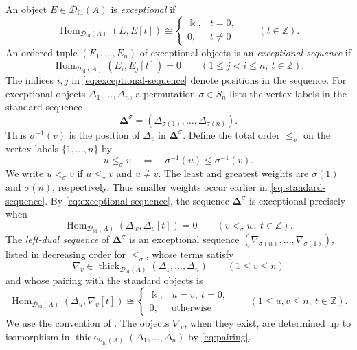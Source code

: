 \documentclass[11pt,a4paper]{article}
\newcommand{\defn}[1]{\textsl{\color{darkblue} #1}}
\newcommand{\D}{\mathcal D}
\newcommand{\ZZ}{\mathbb{Z}}
\newcommand{\std}{\Delta}
\newcommand{\costd}{\nabla}
\DeclareMathOperator{\fd}{fd}
\DeclareMathOperator{\Hom}{Hom}
\DeclareMathOperator{\thick}{thick}
\theoremstyle{plain}
\theoremstyle{definition}
\numberwithin{equation}{section}
\begin{document}
An object $E\in\D_{\fd}(A)$ is \defn{exceptional} if
\begin{equation}\label{eq:exceptional}
 \Hom_{\D_{\fd}(A)}(E,E[t])\cong
 \begin{cases}
 \Bbbk,&t=0,\\
 0,&t\neq0
 \end{cases}
\qquad(t\in\ZZ).
\end{equation}
An ordered tuple $(E_1,\ldots,E_n)$ of exceptional objects is an
\defn{exceptional sequence} if
\begin{equation}\label{eq:exceptional-sequence}
 \Hom_{\D_{\fd}(A)}(E_i,E_j[t])=0
 \qquad(1\leq j<i\leq n,\ t\in\ZZ).
\end{equation}
The indices $i,j$ in \eqref{eq:exceptional-sequence} denote positions
in the sequence.
For exceptional objects $\std_1,\ldots,\std_n$, a permutation
$\sigma\in S_n$ lists the vertex labels in the standard sequence
\begin{equation}\label{eq:standard-sequence}
 \boldsymbol\std^\sigma
 =(\std_{\sigma(1)},\ldots,\std_{\sigma(n)}).
\end{equation}
Thus $\sigma^{-1}(v)$ is the position of $\std_v$ in
$\boldsymbol\std^\sigma$. Define the total order $\leq_\sigma$ on
the vertex labels $\{1,\ldots,n\}$ by
\begin{equation}\label{eq:order}
 u\leq_\sigma v\quad\Longleftrightarrow\quad
 \sigma^{-1}(u)\leq\sigma^{-1}(v).
\end{equation}
We write $u<_\sigma v$ if $u\leq_\sigma v$ and $u\neq v$.
The least and greatest weights are $\sigma(1)$ and $\sigma(n)$,
respectively. Thus smaller weights occur earlier in
\eqref{eq:standard-sequence}. By \eqref{eq:exceptional-sequence},
the sequence $\boldsymbol\std^\sigma$ is exceptional precisely when
\begin{equation}\label{eq:semiorthogonal}
 \Hom_{\D_{\fd}(A)}(\std_w,\std_v[t])=0
 \qquad(v<_\sigma w,\ t\in\ZZ).
\end{equation}
The \defn{left-dual sequence} of $\boldsymbol\std^\sigma$ is an
exceptional sequence $(\costd_{\sigma(n)},\ldots,\costd_{\sigma(1)})$,
listed in decreasing order for $\leq_\sigma$, whose terms satisfy
\begin{equation}\label{eq:left-dual-membership}
 \costd_v\in\thick_{\D_{\fd}(A)}(\std_1,\ldots,\std_n)
 \qquad(1\leq v\leq n)
\end{equation}
and whose pairing with the standard objects is
\begin{equation}\label{eq:pairing}
 \Hom_{\D_{\fd}(A)}(\std_u,\costd_v[t])\cong
 \begin{cases}
 \Bbbk,&u=v,\ t=0,\\
 0,&\text{otherwise}
 \end{cases}
 \qquad(1\leq u,v\leq n,\ t\in\ZZ).
\end{equation}
We use the convention of \cite[\S2.3]{BB26}. The objects $\costd_v$,
when they exist, are determined up to isomorphism in
$\thick_{\D_{\fd}(A)}(\std_1,\ldots,\std_n)$ by \eqref{eq:pairing}.
\end{document}
